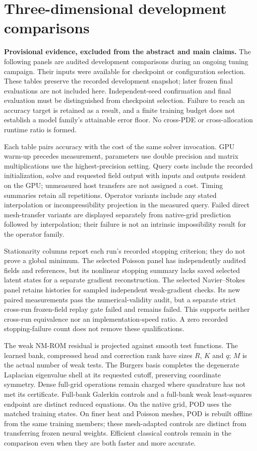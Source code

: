 \clearpage
\section{Three-dimensional development comparisons}
\label{app:campaign-development}

\textbf{Provisional evidence, excluded from the abstract and main claims.}
The following panels are audited development comparisons during an
ongoing tuning campaign. Their inputs were available for checkpoint or
configuration selection. These tables preserve the recorded development snapshot; later frozen
final evaluations are not included here. Independent-seed confirmation
and final evaluation must be distinguished from checkpoint selection. Failure to reach an accuracy
target is retained as a result, and a finite training budget does not
establish a model family's attainable error floor. No cross-PDE or
cross-allocation runtime ratio is formed.

Each table pairs accuracy with the cost of the same solver invocation.
GPU warm-up precedes measurement, parameters use double precision and
matrix multiplications use the highest-precision setting. Query costs
include the recorded initialization, solve and requested field output
with inputs and outputs resident on the GPU; unmeasured host transfers
are not assigned a cost. Timing summaries retain all repetitions.
Operator variants include any stated interpolation or incompressibility
projection in the measured query. Failed direct mesh-transfer variants
are displayed separately from native-grid prediction followed by
interpolation; their failure is not an intrinsic impossibility result
for the operator family.

Stationarity columns report each run's recorded stopping criterion;
they do not prove a global minimum. The selected Poisson panel has
independently audited fields and references, but its nonlinear stopping
summary lacks saved selected latent states for a separate gradient
reconstruction. The selected Navier--Stokes panel retains histories for
sampled independent weak-gradient checks. Its new paired measurements
pass the numerical-validity audit, but a separate strict cross-run
frozen-field replay gate failed and remains failed. This supports neither
cross-run equivalence nor an implementation-speed ratio. A zero recorded
stopping-failure count does not remove these qualifications.

The weak NM-ROM residual is projected against smooth test functions.
The learned bank, compressed head and correction rank have sizes
$R$, $K$ and $q$; $M$ is the actual number of weak tests. The Burgers
basis completes the degenerate Laplacian eigenvalue shell at its
requested cutoff, preserving coordinate symmetry. Dense full-grid
operations remain charged where quadrature has not met its certificate.
Full-bank Galerkin controls and a full-bank weak least-squares endpoint
are distinct reduced equations. On the native grid, POD uses the matched
training states. On finer heat and Poisson meshes, POD is rebuilt offline
from the same training members; these mesh-adapted controls are distinct
from transferring frozen neural weights.
Efficient classical controls remain in the comparison even when they
are both faster and more accurate.

